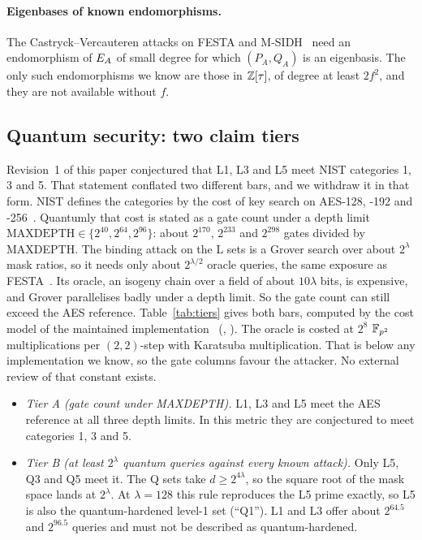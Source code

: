 \paragraph{Eigenbases of known endomorphisms.} The Castryck--Vercauteren
attacks on FESTA and M-SIDH~\cite{CV23} need an endomorphism of $E_A$ of
small degree for which $(P_A,Q_A)$ is an eigenbasis. The only such
endomorphisms we know are those in $\mathbb{Z}[\tau]$, of degree at least $2f^2$,
and they are not available without $f$.

\subsection{Quantum security: two claim tiers}\label{sec:nist}
Revision~1 of this paper conjectured that L1, L3 and L5 meet NIST categories
1, 3 and 5. That statement conflated two different bars, and we withdraw it
in that form. NIST defines the categories by the cost of key search on
AES-128, -192 and -256~\cite{NIST16}. Quantumly that cost is stated as a gate
count under a depth limit $\mathrm{MAXDEPTH}\in\{2^{40},2^{64},2^{96}\}$:
about $2^{170}$, $2^{233}$ and $2^{298}$ gates divided by MAXDEPTH. The binding
attack on the L sets is a Grover search over about $2^{\lambda}$ mask ratios,
so it needs only about $2^{\lambda/2}$ oracle queries, the same exposure as
FESTA~\cite{BMP23}. Its oracle, an isogeny chain over a field of about
$10\lambda$ bits, is expensive, and Grover parallelises badly under a depth
limit. So the gate count can still exceed the AES reference.
Table~\ref{tab:tiers} gives both bars, computed by the cost model of the
maintained implementation~\cite{EigenX}
(, ).
The oracle is costed at $2^8$ $\mathbb{F}_{p^2}$ multiplications per $(2,2)$-step with
Karatsuba multiplication. That is below any implementation we know, so the
gate columns favour the attacker. No external review of that constant
exists.

\begin{itemize}
\item \emph{Tier A (gate count under MAXDEPTH).} L1, L3 and L5 meet the AES
  reference at all three depth limits. In this metric they are conjectured
  to meet categories 1, 3 and 5.
\item \emph{Tier B (at least $2^\lambda$ quantum queries against every known
  attack).} Only L5, Q3 and Q5 meet it. The Q sets take $d\ge 2^{4\lambda}$, so
  the square root of the mask space lands at $2^\lambda$. At $\lambda=128$ this
  rule reproduces the L5 prime exactly, so L5 is also the quantum-hardened
  level-1 set (``Q1''). L1 and L3 offer about $2^{64.5}$ and $2^{96.5}$
  queries and must not be described as quantum-hardened.
\end{itemize}

